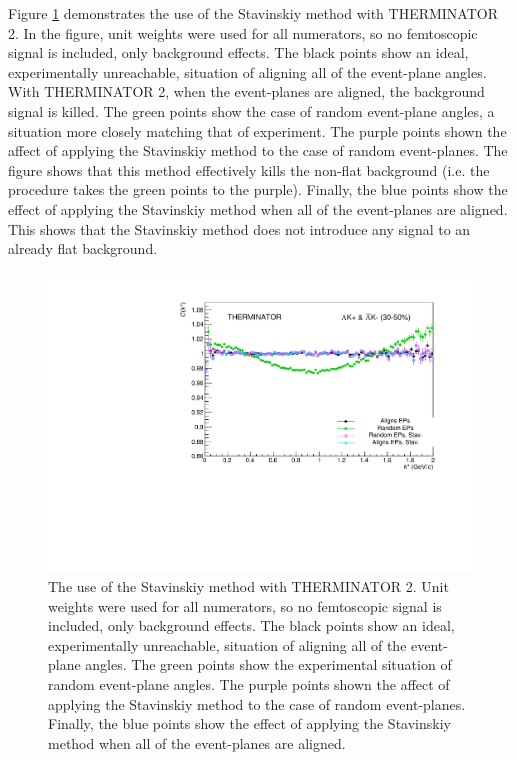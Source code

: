 \documentclass[/home/jesse/Analysis/FemtoAnalysis/AnalysisNotes/AnalysisNoteJBuxton.tex]{subfiles}
\begin{document}
Figure \ref{fig:BgdRedMethodsTHERM} demonstrates the use of the Stavinskiy method with THERMINATOR 2.  
In the figure, unit weights were used for all numerators, so no femtoscopic signal is included, only background effects.  
The black points show an ideal, experimentally unreachable, situation of aligning all of the event-plane angles.  
With THERMINATOR 2, when the event-planes are aligned, the background signal is killed.  
The green points show the case of random event-plane angles, a situation more closely matching that of experiment.  
The purple points shown the affect of applying the Stavinskiy method to the case of random event-planes.  
The figure shows that this method effectively kills the non-flat background (i.e. the procedure takes the green points to the purple).  
Finally, the blue points show the effect of applying the Stavinskiy method when all of the event-planes are aligned.  
This shows that the Stavinskiy method does not introduce any signal to an already flat background.


\begin{figure}[h]
  \centering
  \includegraphics[width=\textwidth]{5_Fitting/Figures/CompareBackgroundReductionMethods_Full_LamKchPwConj_3050_NumWeight1.pdf}
  \caption[Background reduction methods with THERMINATOR]{The use of the Stavinskiy method with THERMINATOR 2.  Unit weights were used for all numerators, so no femtoscopic signal is included, only background effects.  The black points show an ideal, experimentally unreachable, situation of aligning all of the event-plane angles.  The green points show the experimental situation of random event-plane angles.  The purple points shown the affect of applying the Stavinskiy method to the case of random event-planes.  Finally, the blue points show the effect of applying the Stavinskiy method when all of the event-planes are aligned.}
  \label{fig:BgdRedMethodsTHERM}
\end{figure}
\end{document}
